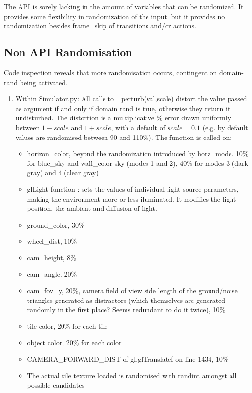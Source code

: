 The API is sorely lacking in the amount of variables that can be randomized.
It provides some flexibility in randomization of the input, but it provides no randomization besides frame\_skip of transitions and/or actions.

\subsection{Non API Randomisation}

Code inspection reveals that more randomisation occurs, contingent on domain-rand being activated.
\begin{enumerate}
    \item Within Simulator.py: All calls to \_perturb(val,scale) distort the value passed as argument if and only if domain rand is true, otherwise they return it undisturbed. The distortion is a multiplicative \% error drawn uniformly between $1 - scale$ and $1 + scale$, with a default of $scale = 0.1$ (e.g. by default values are randomised between 90 and 110\%). The function is called on:
        \begin{itemize}
            \item horizon\_color, beyond the randomization introduced by horz\_mode. 10\% for blue\_sky and wall\_color sky (modes 1 and 2), 40\% for modes 3 (dark gray) and 4 (clear gray)
            \item glLight function : sets the values of individual light source parameters, making the environment more or less iluminated. It modifies the light position, the ambient and diffusion of light.
            \item ground\_color, 30\%
            \item wheel\_dist, 10\%
            \item cam\_height, 8\%
            \item cam\_angle, 20\%
            \item cam\_fov\_y, 20\%, camera field of view
                side length of the ground/noise triangles generated as distractors (which themselves are generated randomly in the first place? Seems redundant to do it twice), 10\%
            \item tile color, 20\% for each tile
            \item object color, 20\% for each color
            \item CAMERA\_FORWARD\_DIST of gl.glTranslatef on line 1434, 10\%
            \item The actual tile texture loaded is randomised with randint amongst all possible candidates

\end{itemize}
\end{enumerate}
